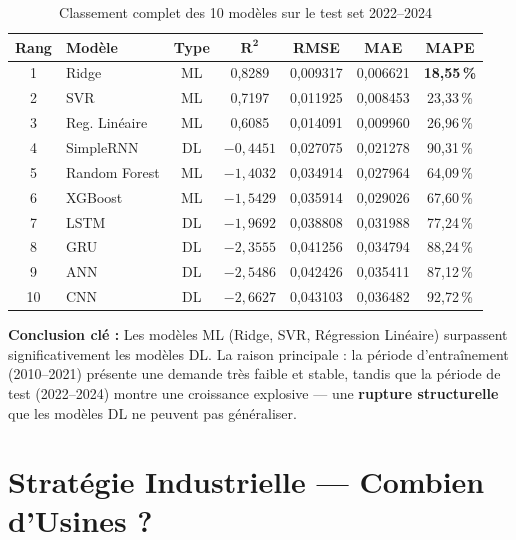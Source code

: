 \documentclass[12pt,a4paper]{article}
\begin{document}
\begin{table}[H]
\centering
\caption{Classement complet des 10 modèles sur le test set 2022--2024}
\begin{tabular}{clccccc}
\toprule
\textbf{Rang} & \textbf{Modèle} & \textbf{Type}
  & $\boldsymbol{R^2}$ & \textbf{RMSE} & \textbf{MAE} & \textbf{MAPE} \\
\midrule
\rowcolor{rowblue}
1  & Ridge          & ML & 0,8289  & 0,009317 & 0,006621 & \textbf{18,55\,\%} \\
2  & SVR            & ML & 0,7197  & 0,011925 & 0,008453 & 23,33\,\% \\
3  & Reg. Linéaire  & ML & 0,6085  & 0,014091 & 0,009960 & 26,96\,\% \\
\midrule
4  & SimpleRNN      & DL & $-0{,}4451$ & 0,027075 & 0,021278 & 90,31\,\% \\
5  & Random Forest  & ML & $-1{,}4032$ & 0,034914 & 0,027964 & 64,09\,\% \\
6  & XGBoost        & ML & $-1{,}5429$ & 0,035914 & 0,029026 & 67,60\,\% \\
7  & LSTM           & DL & $-1{,}9692$ & 0,038808 & 0,031988 & 77,24\,\% \\
8  & GRU            & DL & $-2{,}3555$ & 0,041256 & 0,034794 & 88,24\,\% \\
9  & ANN            & DL & $-2{,}5486$ & 0,042426 & 0,035411 & 87,12\,\% \\
10 & CNN            & DL & $-2{,}6627$ & 0,043103 & 0,036482 & 92,72\,\% \\
\bottomrule
\end{tabular}
\end{table}

\begin{conclusionbox}
\textbf{Conclusion clé :} Les modèles ML (Ridge, SVR, Régression Linéaire) surpassent
significativement les modèles DL. La raison principale : la période d'entraînement
(2010--2021) présente une demande très faible et stable, tandis que la période de test
(2022--2024) montre une croissance explosive --- une \textbf{rupture structurelle} que
les modèles DL ne peuvent pas généraliser.
\end{conclusionbox}

\section{Stratégie Industrielle --- Combien d'Usines ?}
\end{document}
